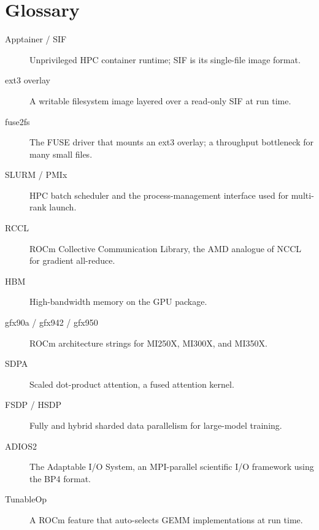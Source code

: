 \documentclass[11pt]{article}
\begin{document}
\section{Glossary}
\begin{description}
\item[Apptainer / SIF] Unprivileged HPC container runtime; SIF is its single-file image format.
\item[ext3 overlay] A writable filesystem image layered over a read-only SIF at run time.
\item[fuse2fs] The FUSE driver that mounts an ext3 overlay; a throughput bottleneck for many small files.
\item[SLURM / PMIx] HPC batch scheduler and the process-management interface used for multi-rank launch.
\item[RCCL] ROCm Collective Communication Library, the AMD analogue of NCCL for gradient all-reduce.
\item[HBM] High-bandwidth memory on the GPU package.
\item[gfx90a / gfx942 / gfx950] ROCm architecture strings for MI250X, MI300X, and MI350X.
\item[SDPA] Scaled dot-product attention, a fused attention kernel.
\item[FSDP / HSDP] Fully and hybrid sharded data parallelism for large-model training.
\item[ADIOS2] The Adaptable I/O System, an MPI-parallel scientific I/O framework using the BP4 format.
\item[TunableOp] A ROCm feature that auto-selects GEMM implementations at run time.
\end{description}



\end{document}
